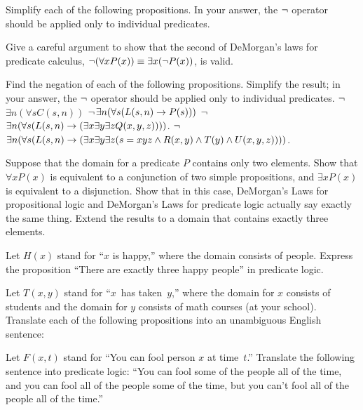 \begin{exercises}

\problem Simplify each of the following propositions.  In your answer, the
$\lnot$ operator should be applied only to individual predicates.

\problem Give a careful argument to show that the second of DeMorgan's laws for
predicate calculus,
$\lnot(\forall x P(x)) \equiv \exists x(\lnot P(x))$, is valid.

\problem Find the negation of each of the following propositions.
Simplify the result; in your answer, the
$\lnot$ operator should be applied only to individual predicates.
\ppart $\lnot$$\exists n (\forall s C(s,n))$
\ppart $\lnot$$\exists n (\forall s (L(s,n) \rightarrow P(s)))$
\ppart $\lnot$$\exists n (\forall s (L(s,n) \rightarrow (\exists x \exists y \exists z Q(x,y,z))))$.
\ppart $\lnot$$\exists n (\forall s (L(s,n) \rightarrow (\exists x \exists y \exists z (s=xyz \land 
R(x,y) \land T(y) \land U(x,y,z))))$.

\problem Suppose that the domain for a predicate $P$
contains only two elements.  Show that $\forall x P(x)$ is equivalent to
a conjunction of two simple propositions, and $\exists x P(x)$ is equivalent
to a disjunction.  Show that in this case, DeMorgan's Laws for propositional
logic and DeMorgan's Laws for predicate logic actually say exactly the same
thing.  Extend the results to a domain that contains exactly
three elements.

\problem Let $H(x)$ stand for ``$x$ is happy,'' where the domain 
consists of people.  Express the proposition ``There are exactly three happy
people'' in predicate logic.

\problem Let $T(x,y)$ stand for ``$x$~has taken~$y$,'' where the
domain for $x$ consists of students and the domain
for $y$ consists of math courses (at your school).
Translate each of the following propositions into an unambiguous English sentence:

\problem Let $F(x,t)$ stand for ``You can fool person $x$ at time~$t$.''
Translate the following sentence into predicate logic:
``You can fool some of the people all of the time, and you can fool
all of the people some of the time, but you can't fool all of the
people all of the time.''


\end{exercises}
